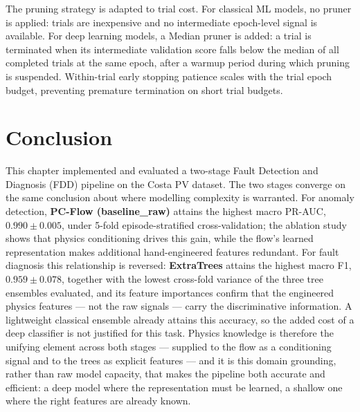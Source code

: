 The pruning strategy is adapted to trial cost. For classical ML models, no pruner is applied: trials are inexpensive and no intermediate epoch-level signal is available. For deep learning models, a Median pruner is added: a trial is terminated when its intermediate validation score falls below the median of all completed trials at the same epoch, after a warmup period during which pruning is suspended. Within-trial early stopping patience scales with the trial epoch budget, preventing premature termination on short trial budgets.







\section{Conclusion}
This chapter implemented and evaluated a two-stage Fault Detection and Diagnosis (FDD) pipeline on the Costa PV dataset. The two stages converge on the same conclusion about where modelling complexity is warranted. For anomaly detection, \textbf{PC-Flow (baseline\_raw)} attains the highest macro PR-AUC, $0.990 \pm 0.005$, under 5-fold episode-stratified cross-validation; the ablation study shows that physics conditioning drives this gain, while the flow's learned representation makes additional hand-engineered features redundant. For fault diagnosis this relationship is reversed: \textbf{ExtraTrees} attains the highest macro F1, $0.959 \pm 0.078$, together with the lowest cross-fold variance of the three tree ensembles evaluated, and its feature importances confirm that the engineered physics features — not the raw signals — carry the discriminative information. A lightweight classical ensemble already attains this accuracy, so the added cost of a deep classifier is not justified for this task. Physics knowledge is therefore the unifying element across both stages — supplied to the flow as a conditioning signal and to the trees as explicit features — and it is this domain grounding, rather than raw model capacity, that makes the pipeline both accurate and efficient: a deep model where the representation must be learned, a shallow one where the right features are already known.



